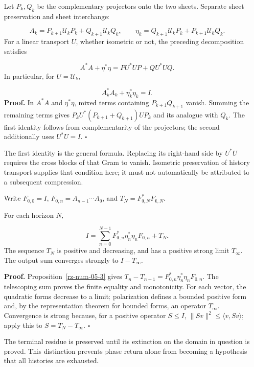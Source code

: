 Let \(P_k,Q_k\) be the complementary projectors onto the two sheets. Separate sheet preservation and sheet interchange:

\[
A_k=P_{k+1}\mathcal U_kP_k+Q_{k+1}\mathcal U_kQ_k,
\qquad
\eta_k=Q_{k+1}\mathcal U_kP_k+P_{k+1}\mathcal U_kQ_k.
\]
For a linear transport \(U\), whether isometric or not, the preceding decomposition satisfies

\[
A^*A+\eta^*\eta=PU^*UP+QU^*UQ.
\]
In particular, for \(U=\mathcal U_k\),

\[
A_k^*A_k+\eta_k^*\eta_k=I.
\]
\textbf{Proof.} In \(A^*A\) and \(\eta^*\eta\), mixed terms containing \(P_{k+1}Q_{k+1}\) vanish. Summing the remaining terms gives \(P_kU^*(P_{k+1}+Q_{k+1})UP_k\) and its analogue with \(Q_k\). The first identity follows from complementarity of the projectors; the second additionally uses \(U^*U=I\). \hfill\(\square\)

The first identity is the general formula. Replacing its right-hand side by \(U^*U\) requires the cross blocks of that Gram to vanish. Isometric preservation of history transport supplies that condition here; it must not automatically be attributed to a subsequent compression.

Write \(F_{0,0}=I\), \(F_{0,n}=A_{n-1}\cdots A_0\), and \(T_N=F_{0,N}^*F_{0,N}\).

For each horizon \(N\),

\[
I=\sum_{n=0}^{N-1}
F_{0,n}^*\eta_n^*\eta_nF_{0,n}+T_N.
\]
The sequence \(T_N\) is positive and decreasing, and has a positive strong limit \(T_\infty\). The output sum converges strongly to \(I-T_\infty\).

\textbf{Proof.} Proposition~\ref{rz-num-05-3} gives \(T_n-T_{n+1}=F_{0,n}^*\eta_n^*\eta_nF_{0,n}\). The telescoping sum proves the finite equality and monotonicity. For each vector, the quadratic forms decrease to a limit; polarization defines a bounded positive form and, by the representation theorem for bounded forms, an operator \(T_\infty\). Convergence is strong because, for a positive operator \(S\leq I\), \(\|Sv\|^2\leq\langle v,Sv\rangle\); apply this to \(S=T_N-T_\infty\). \hfill\(\square\)

The terminal residue is preserved until its extinction on the domain in question is proved. This distinction prevents phase return alone from becoming a hypothesis that all histories are exhausted.

